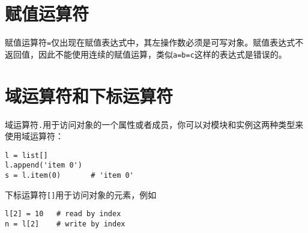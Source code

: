\section{赋值运算符}

赋值运算符\texttt{=}仅出现在赋值表达式中，其左操作数必须是可写对象。赋值表达式不返回值，因此不能使用连续的赋值运算，类似\texttt{a=b=c}这样的表达式是错误的。

\section{域运算符和下标运算符}

域运算符\texttt{.}用于访问对象的一个属性或者成员，你可以对模块和实例这两种类型来使用域运算符：
\begin{lstlisting}[language=berry, numbers=none]
l = list[]
l.append('item 0')
s = l.item(0)       # 'item 0'
\end{lstlisting}

下标运算符\texttt{[]}用于访问对象的元素，例如
\begin{lstlisting}[language=berry, numbers=none]
l[2] = 10   # read by index
n = l[2]    # write by index
\end{lstlisting}
